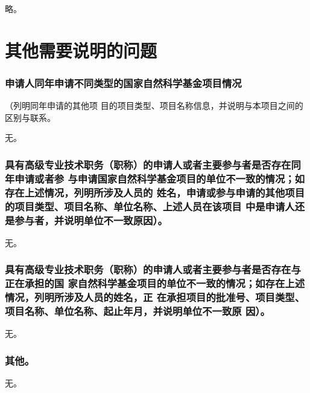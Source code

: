 \documentclass[subfig,boldtoc]{mynsfc}
\begin{document}
略。

\part{其他需要说明的问题}
\label{cha:others}

\section{申请人同年申请不同类型的国家自然科学基金项目情况}{（列明同年申请的其他项
  目的项目类型、项目名称信息，并说明与本项目之间的区别与联系。}

无。

\section{具有高级专业技术职务（职称）的申请人或者主要参与者是否存在同年申请或者参
  与申请国家自然科学基金项目的单位不一致的情况；如存在上述情况，列明所涉及人员的
  姓名，申请或参与申请的其他项目的项目类型、项目名称、单位名称、上述人员在该项目
  中是申请人还是参与者，并说明单位不一致原因）。}{}
\label{sec:inconsistent}

无。

\section{具有高级专业技术职务（职称）的申请人或者主要参与者是否存在与正在承担的国
  家自然科学基金项目的单位不一致的情况；如存在上述情况，列明所涉及人员的姓名，正
  在承担项目的批准号、项目类型、项目名称、单位名称、起止年月，并说明单位不一致原
  因）。}{}

无。

\section{其他。}{}

无。
\end{document}
